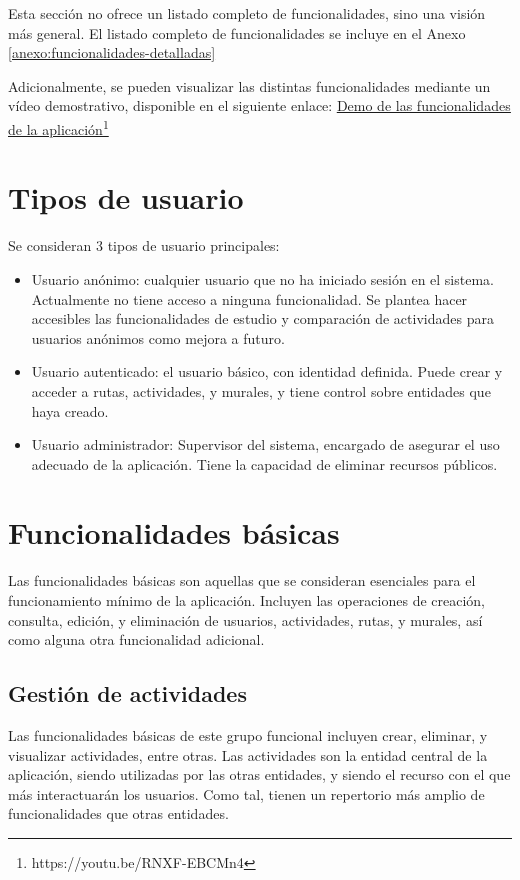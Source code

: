 Esta sección no ofrece un listado completo de funcionalidades, sino una visión más general. El listado completo de funcionalidades se incluye en el Anexo \ref{anexo:funcionalidades-detalladas}

Adicionalmente, se pueden visualizar las distintas funcionalidades mediante un vídeo demostrativo, disponible en el siguiente enlace: \href{https://youtu.be/RNXF-EBCMn4}{\uline{Demo de las funcionalidades de la aplicación}\footnote{\url{https://youtu.be/RNXF-EBCMn4}}}

\section{Tipos de usuario}
Se consideran 3 tipos de usuario principales:
\begin{itemize}
    \item Usuario anónimo: cualquier usuario que no ha iniciado sesión en el sistema. Actualmente no tiene acceso a ninguna funcionalidad. Se plantea hacer accesibles las funcionalidades de estudio y comparación de actividades para usuarios anónimos como mejora a futuro.
    \item Usuario autenticado: el usuario básico, con identidad definida. Puede crear y acceder a rutas, actividades, y murales, y tiene control sobre entidades que haya creado.
    \item Usuario administrador: Supervisor del sistema, encargado de asegurar el uso adecuado de la aplicación. Tiene la capacidad de eliminar recursos públicos.
\end{itemize}

\section{Funcionalidades básicas}
Las funcionalidades básicas son aquellas que se consideran esenciales para el funcionamiento mínimo de la aplicación. Incluyen las operaciones de creación, consulta, edición, y eliminación de usuarios, actividades, rutas, y murales, así como alguna otra funcionalidad adicional.

\subsection{Gestión de actividades}
Las funcionalidades básicas de este grupo funcional incluyen crear, eliminar, y visualizar actividades, entre otras. Las actividades son la entidad central de la aplicación, siendo utilizadas por las otras entidades, y siendo el recurso con el que más interactuarán los usuarios. Como tal, tienen un repertorio más amplio de funcionalidades que otras entidades. 

